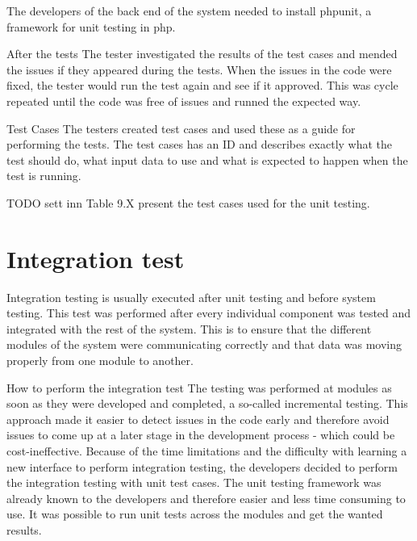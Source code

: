 The developers of the back end of the system needed to install phpunit, a framework for unit testing in php.\newline

After the tests\newline
The tester investigated the results of the test cases and mended the issues if they appeared during the tests. When the issues in the code were fixed, the tester would run the test again and see if it approved. This was cycle repeated until the code was free of issues and runned the expected way.\newline

Test Cases\newline
The testers created test cases and used these as a guide for performing the tests. The test cases has an ID and describes exactly what the test should do, what input data to use and what is expected to happen when the test is running.   

TODO sett inn Table 9.X present the test cases used for the unit testing.\newline

\section{Integration test}

Integration testing is usually executed after unit testing and before system testing. This test was performed after every individual component was tested and integrated with the rest of the system. This is to ensure that the different modules of the system were communicating correctly and that data was moving properly from one module to another. \newline

How to perform the integration test\newline
The testing was performed at modules as soon as they were developed and completed, a so-called incremental testing. This approach made it easier to detect issues in the code early and therefore avoid issues to come up at a later stage in the development process - which could be cost-ineffective.
Because of the time limitations and the difficulty with learning a new interface to perform integration testing, the developers decided to perform the integration testing with unit test cases. The unit testing framework was already known to the developers and therefore easier and less time consuming to use. It was possible to run unit tests across the modules and get the wanted results.\newline

